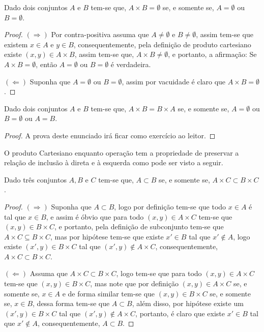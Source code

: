 \begin{theorem}\label{teo:AbsorcaoCatersiano}
	Dado dois conjuntos $A$ e $B$ tem-se que, $A \times B = \emptyset$ se, e somente se, $A = \emptyset$ ou $B = \emptyset$.
\end{theorem}

\begin{proof}
	$(\Rightarrow)$ Por contra-positiva assuma que $A \neq \emptyset$ e $B \neq \emptyset$, assim tem-se que existem $x \in A$ e $y \in B$, consequentemente, pela definição de produto cartesiano existe $(x,y) \in A \times B$, assim tem-se que, $A \times B \neq \emptyset$, e portanto, a afirmação: Se $A \times B = \emptyset$, então $A = \emptyset$ ou $B = \emptyset$ é verdadeira.
	
	$(\Leftarrow)$ Suponha que $A = \emptyset$ ou $B = \emptyset$, assim por vacuidade é claro que $A \times B = \emptyset$.
\end{proof}

\begin{theorem}\label{teo:IgualdadeCartesiano}
	Dado dois conjuntos $A$ e $B$ tem-se que, $A \times B = B \times A$ se, e somente se, $A = \emptyset$ ou $B = \emptyset$ ou $A = B$.
\end{theorem}

\begin{proof}
	A prova deste enunciado irá ficar como exercício ao leitor.
\end{proof}

O produto Cartesiano enquanto operação tem a propriedade de preservar a relação de inclusão à direta e à esquerda como pode ser visto a seguir.

\begin{theorem}\label{teo:CartesianoMonoDireita}
	Dado três conjuntos $A, B$ e $C$ tem-se que, $A \subset B$ se, e somente se, $A \times C \subset B \times C$.
\end{theorem}

\begin{proof}
	$(\Rightarrow)$ Suponha que $A \subset B$, logo por definição tem-se que todo $x \in A$ é tal que $x \in B$, e assim é óbvio que para todo $(x,y) \in A \times C$ tem-se que $(x, y) \in B \times C$, e portanto, pela definição de subconjunto tem-se que $A \times C \subseteq B \times C$, mas por hipótese tem-se que existe $x' \in B$ tal que $x' \notin A$, logo existe $(x', y) \in B \times C$ tal que $(x', y) \notin A \times C$, consequentemente, $A \times C \subset B \times C$.
	
	$(\Leftarrow)$ Assuma que $A \times C \subset B \times C$, logo tem-se que para todo $(x, y) \in A \times C$ tem-se que $(x, y) \in B \times C$, mas note que por definição $(x, y) \in A \times C$ se, e somente se, $x \in A$ e de forma similar tem-se que $(x, y) \in B \times C$ se, e somente se, $x \in B$, dessa forma tem-se que $A \subset B$, além disso, por hipótese existe um $(x', y) \in B \times C$ tal que $(x', y) \notin A \times C$, portanto, é claro que existe $x' \in B$ tal que $x' \notin A$, consequentemente, $A \subset B$.
\end{proof}

